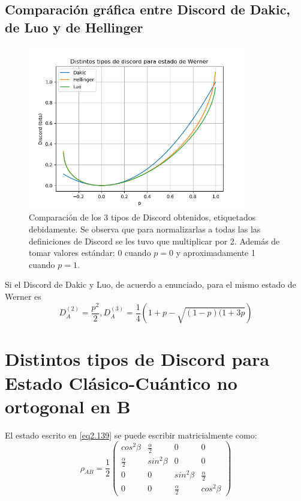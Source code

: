 \documentclass{book}
\begin{document}
\subsection{Comparación gráfica entre Discord de Dakic, de Luo y de Hellinger}
\begin{figure}[ht][ht]
    \includegraphics[width=0.85\textwidth]{test2.png}
    \caption{Comparación de los 3 tipos de Discord obtenidos, etiquetados debidamente. Se observa que para normalizarlas a todas las las definiciones de Discord se les tuvo que multiplicar por 2. Además de tomar valores estándar: 0 cuando $p=0$ y aproximadamente 1 cuando $p=1$.}
\end{figure}
Si el Discord de Dakic y Luo, de acuerdo a enunciado, para el mismo estado de Werner es
\begin{equation}\label{eq2.156}D_A^{(2)}=\frac{p^2}{2}, D_A^{(3)}=\frac{1}{4}(1+p-\sqrt{(1-p)(1+3p})\end{equation}
\section{Distintos tipos de Discord para Estado Clásico-Cuántico no ortogonal en B}
El estado escrito en \ref{eq2.139} se puede escribir matricialmente como: 
\begin{equation}\label{eq2.157}\rho_{AB}= \frac{1}{2} \begin{pmatrix} cos^2 \beta &\frac{\alpha}{2}& 0 & 0 \\  \frac{\alpha}{2}& sin^2 \beta & 0& 0 \\ 0&0 & sin^2 \beta & \frac{\alpha}{2}\\ 0&0 & \frac{\alpha}{2} & cos^2 \beta \end{pmatrix}\end{equation}
\end{document}
